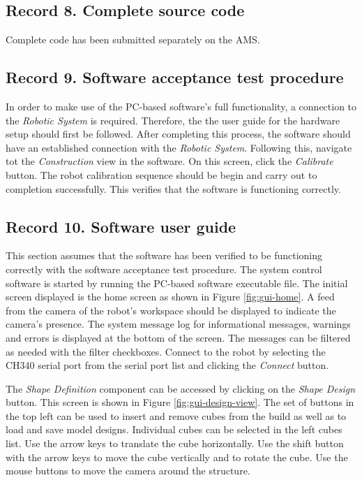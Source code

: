 \newpage

\subsection{Record 8. Complete source code}
Complete code has been submitted separately on the AMS.

\newpage

\subsection{Record 9. Software acceptance test procedure}

In order to make use of the PC-based software's full functionality, a connection to the \textit{Robotic System} is required. Therefore, the the user guide for the hardware setup should first be followed. After completing this process, the software should have an established connection with the \textit{Robotic System}. Following this, navigate tot the \textit{Construction} view in the software. On this screen, click the \textit{Calibrate} button. The robot calibration sequence should be begin and carry out to completion successfully. This verifies that the software is functioning correctly.

\newpage

\subsection{Record 10. Software user guide}

This section assumes that the software has been verified to be functioning correctly with the software acceptance test procedure. The system control software is started by running the PC-based software executable file. The initial screen displayed is the home screen as shown in Figure \ref{fig:gui-home}. A feed from the camera of the robot's workspace should be displayed to indicate the camera's presence. The system message log for informational messages, warnings and errors is displayed at the bottom of the screen. The messages can be filtered as needed with the filter checkboxes. Connect to the robot by selecting the CH340 serial port from the serial port list and clicking the \textit{Connect} button.

The \textit{Shape Definition} component can be accessed by clicking on the \textit{Shape Design} button. This screen is shown in Figure \ref{fig:gui-design-view}. The set of buttons in the top left can be used to insert and remove cubes from the build as well as to load and save model designs. Individual cubes can be selected in the left cubes list. Use the arrow keys to translate the cube horizontally. Use the shift button with the arrow keys to move the cube vertically and to rotate the cube. Use the mouse buttons to move the camera around the structure.

